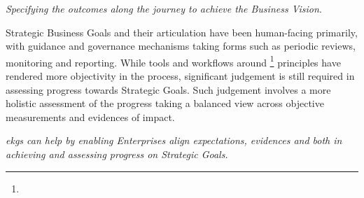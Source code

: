 \textit{Specifying the outcomes along the journey to achieve the Business Vision}.

Strategic Business Goals and their articulation have been human-facing primarily, with guidance and governance mechanisms
taking forms such as periodic reviews, monitoring and reporting.
While tools and workflows around \footnote{} principles have rendered more objectivity
in the process, significant judgement is still required in assessing progress towards Strategic Goals.
Such judgement involves a more holistic assessment of the progress taking a balanced view across objective measurements
and evidences of impact.

\textit{\Glspl{ekg} can help by enabling Enterprises align expectations, evidences and
 both in achieving and assessing progress on Strategic Goals.}